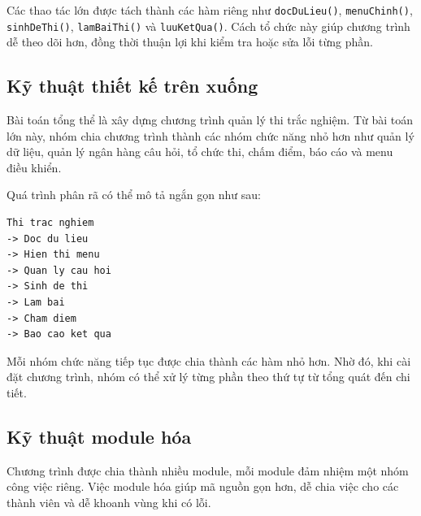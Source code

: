 \documentclass[12pt,a4paper]{report}
\begin{document}
Các thao tác lớn được tách thành các hàm riêng như \texttt{docDuLieu()}, \texttt{menuChinh()}, \texttt{sinhDeThi()}, \texttt{lamBaiThi()} và \texttt{luuKetQua()}. Cách tổ chức này giúp chương trình dễ theo dõi hơn, đồng thời thuận lợi khi kiểm tra hoặc sửa lỗi từng phần.

\subsection{Kỹ thuật thiết kế trên xuống}

Bài toán tổng thể là xây dựng chương trình quản lý thi trắc nghiệm. Từ bài toán lớn này, nhóm chia chương trình thành các nhóm chức năng nhỏ hơn như quản lý dữ liệu, quản lý ngân hàng câu hỏi, tổ chức thi, chấm điểm, báo cáo và menu điều khiển.

Quá trình phân rã có thể mô tả ngắn gọn như sau:

\begin{lstlisting}[caption={Phân rã chức năng theo thiết kế trên xuống}]
Thi trac nghiem
-> Doc du lieu
-> Hien thi menu
-> Quan ly cau hoi
-> Sinh de thi
-> Lam bai
-> Cham diem
-> Bao cao ket qua
\end{lstlisting}

Mỗi nhóm chức năng tiếp tục được chia thành các hàm nhỏ hơn. Nhờ đó, khi cài đặt chương trình, nhóm có thể xử lý từng phần theo thứ tự từ tổng quát đến chi tiết.

\subsection{Kỹ thuật module hóa}

Chương trình được chia thành nhiều module, mỗi module đảm nhiệm một nhóm công việc riêng. Việc module hóa giúp mã nguồn gọn hơn, dễ chia việc cho các thành viên và dễ khoanh vùng khi có lỗi.
\end{document}
